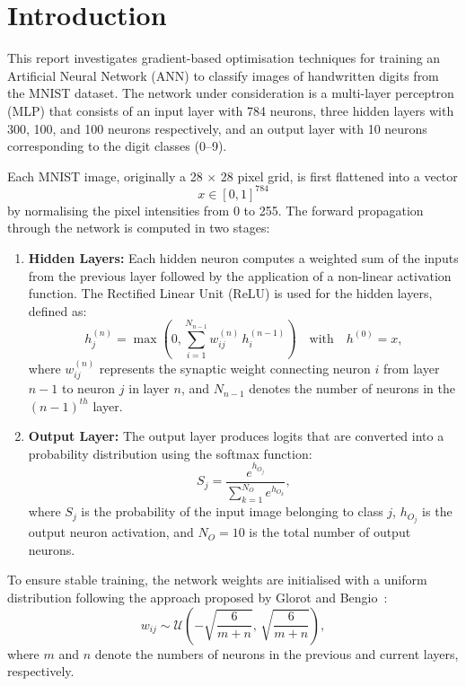 \section{Introduction}
This report investigates gradient-based optimisation techniques for training an Artificial Neural Network (ANN) to classify images of handwritten digits from the MNIST dataset. The network under consideration is a multi-layer perceptron (MLP) that consists of an input layer with 784 neurons, three hidden layers with 300, 100, and 100 neurons respectively, and an output layer with 10 neurons corresponding to the digit classes (0--9).

Each MNIST image, originally a 28 $\times$ 28 pixel grid, is first flattened into a vector
\[
    x \in [0,1]^{784}
\]
by normalising the pixel intensities from 0 to 255. The forward propagation through the network is computed in two stages:
\begin{enumerate}
    \item \textbf{Hidden Layers:}
    Each hidden neuron computes a weighted sum of the inputs from the previous layer followed by the application of a non-linear activation function. The Rectified Linear Unit (ReLU) is used for the hidden layers, defined as:
    \[
        h^{(n)}_j = \max\!\left(0, \sum_{i=1}^{N_{n-1}} w_{ij}^{(n)} \, h_i^{(n-1)}\right) \quad \text{with} \quad h^{(0)} = x,
    \]
    where \(w_{ij}^{(n)}\) represents the synaptic weight connecting neuron \(i\) from layer \(n-1\) to neuron \(j\) in layer \(n\), and \(N_{n-1}\) denotes the number of neurons in the \((n-1)^{th}\) layer.

    \item \textbf{Output Layer:}
    The output layer produces logits that are converted into a probability distribution using the softmax function:
    \[
        S_j = \frac{e^{h_{O_j}}}{\sum_{k=1}^{N_O} e^{h_{O_k}}},
    \]
    where \(S_j\) is the probability of the input image belonging to class \(j\), \(h_{O_j}\) is the output neuron activation, and \(N_O=10\) is the total number of output neurons.
\end{enumerate}

To ensure stable training, the network weights are initialised with a uniform distribution following the approach proposed by Glorot and Bengio~\cite{glorot2010understanding}:
\[
    w_{ij} \sim \mathcal{U}\!\left(-\sqrt{\frac{6}{m+n}},\, \sqrt{\frac{6}{m+n}}\right),
\]
where \(m\) and \(n\) denote the numbers of neurons in the previous and current layers, respectively.

